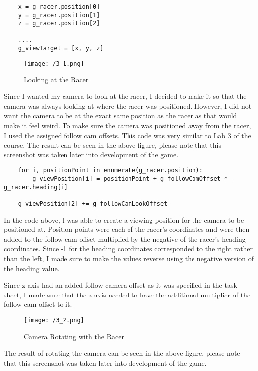 \documentclass[11pt, oneside, a4paper]{article}
\begin{document}
\begin{lstlisting}  
    x = g_racer.position[0]
    y = g_racer.position[1]
    z = g_racer.position[2]

    ....
    g_viewTarget = [x, y, z]
\end{lstlisting}

\begin{figure}[!ht]
	\centerline{\texttt{[image: /3\_1.png]}}
	\caption{Looking at the Racer}
	\label{fig:figure2}
\end{figure}

Since I wanted my camera to look at the racer, I decided to make it so that the camera was always looking at where the racer was positioned. However, I did not want the camera to be at the exact same position as the racer as that would make it feel weird. To make sure the camera was positioned away from the racer, I used the assigned follow cam offsets. This code was very similar to Lab 3 of the course. The result can be seen in the above figure, please note that this screenshot was taken later into development of the game.

\begin{lstlisting}  
    for i, positionPoint in enumerate(g_racer.position): 
        g_viewPosition[i] = positionPoint + g_followCamOffset * -g_racer.heading[i]

    g_viewPosition[2] += g_followCamLookOffset
\end{lstlisting}
In the code above, I was able to create a viewing position for the camera to be positioned at. Position points were each of the racer's coordinates and were then added to the follow cam offset multiplied by the negative of the racer's heading coordinates. Since -1 for the heading coordinates corresponded to the right rather than the left, I made sure to make the values reverse using the negative version of the heading value.

Since z-axis had an added follow camera offset as it was specified in the task sheet, I made sure that the z axis needed to have the additional multiplier of the follow cam offset to it.

\begin{figure}[!ht]
	\centerline{\texttt{[image: /3\_2.png]}}
	\caption{Camera Rotating with the Racer}
	\label{fig:figure3}
\end{figure}
The result of rotating the camera can be seen in the above figure, please note that this screenshot was taken later into development of the game.
\end{document}
